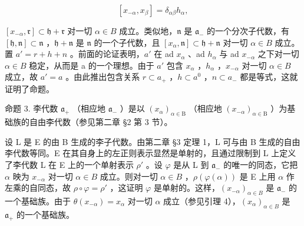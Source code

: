 \[
[ x _ {- \alpha}, x _ {\beta} ] = \delta_ {\alpha \beta} h _ {\alpha},
\]

\([x_{-\alpha}, \mathfrak{r}] \subset \mathfrak{h} + \mathfrak{r}\) 对一切 \(\alpha \in B\) 成立。类似地，\(\mathfrak{n}\) 是 \(\mathfrak{a}_{-}\) 的一个分次子代数，有 \([\mathfrak{h}, \mathfrak{n}] \subset \mathfrak{n}\) ，\(\mathfrak{h} + \mathfrak{n}\) 是 \(\mathfrak{n}\) 的一个子代数，且 \([x_{\alpha}, \mathfrak{n}] \subset \mathfrak{h} + \mathfrak{n}\) 对一切 \(\alpha \in B\) 成立。置 \(a' = r + h + n\) 。前面的论证表明，\(a'\) 在 ad \(x_{\alpha}\) 、ad \(h_{\alpha}\) 与 ad \(x_{-\alpha}\) 之下对一切 \(\alpha \in B\) 稳定，从而是 a 的一个理想。由于 \(a'\) 包含 \(x_{\alpha}\) ，\(h_{\alpha}\) ，\(x_{-\alpha}\) 对一切 \(\alpha \in B\) 成立，故 \(a' = a\) 。由此推出包含关系 \(r \subset a_{+}\) ，\(h \subset a^{0}\) ，\(n \subset a_{-}\) 都是等式，这就证明了命题。

命题 3. 李代数 \(\mathfrak{a}_{+}\) （相应地 \(\mathfrak{a}_{-}\) ）是以 \((x_{\alpha})_{\alpha \in \mathrm{B}}\) （相应地 \((x_{-\alpha})_{\alpha \in \mathrm{B}}\) ）为基础族的自由李代数（参见第二章 §2 第 3 节）。

设 L 是 E 的由 B 生成的李子代数。由第二章 §3 定理 1，L 可与由 B 生成的自由李代数等同。E 在其自身上的左正则表示显然是单射的，且通过限制到 L 上定义了李代数 L 在 E 上的一个单射表示 \(\rho'\) 。设 \(\varphi\) 是从 L 到 \(\mathfrak{a}_{-}\) 的唯一的同态，它把 \(\alpha\) 映为 \(x_{-\alpha}\) 对一切 \(\alpha \in B\) 成立。则对一切 \(\alpha \in B\) ，\(\rho(\varphi(\alpha))\) 是 E 上用 \(\alpha\) 作左乘的自同态，故 \(\rho \circ \varphi = \rho'\) ，这证明 \(\varphi\) 是单射的。这样，\((x_{-\alpha})_{\alpha \in B}\) 是 \(\mathfrak{a}_{-}\) 的一个基础族。由于 \(\theta(x_{-\alpha}) = x_{\alpha}\) 对一切 \(\alpha\) 成立（参见引理 4），\((x_{\alpha})_{\alpha \in B}\) 是 \(\mathfrak{a}_{+}\) 的一个基础族。